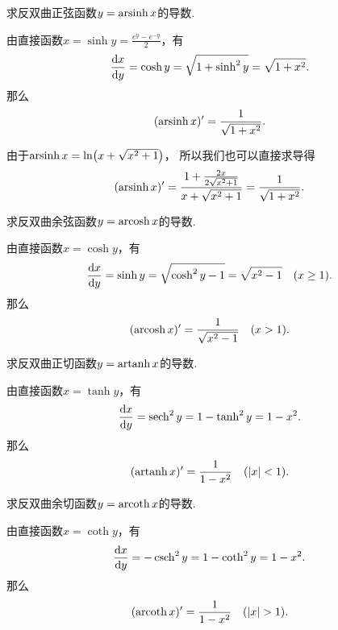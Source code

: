 \begin{example}\label{example:导数.反双曲正弦函数的导数}
求反双曲正弦函数\(y = \operatorname{arsinh} x\)的导数.
\begin{solution}
由直接函数\(x = \sinh y = \frac{e^y - e^{-y}}2\)，有\begin{equation*}
	\dv{x}{y}
	= \cosh y
	= \sqrt{1 + \sinh^2 y}
	= \sqrt{1 + x^2}.
\end{equation*}
那么\begin{equation*}
	(\operatorname{arsinh} x)' = \frac1{\sqrt{1+x^2}}.
\end{equation*}
\end{solution}
\end{example}
\begin{remark}
由于\(\operatorname{arsinh} x = \ln(x+\sqrt{x^2+1})\)，
所以我们也可以直接求导得\begin{equation*}
	(\operatorname{arsinh} x)' = \frac{1+\frac{2x}{2\sqrt{x^2+1}}}{x+\sqrt{x^2+1}}
	= \frac1{\sqrt{1+x^2}}.
\end{equation*}
\end{remark}

\begin{example}
求反双曲余弦函数\(y = \operatorname{arcosh} x\)的导数.
\begin{solution}
由直接函数\(x = \cosh y\)，有\begin{equation*}
	\dv{x}{y}
	= \sinh y
	= \sqrt{\cosh^2 y - 1}
	= \sqrt{x^2 - 1}
	\quad(x\geq1).
\end{equation*}
那么\begin{equation*}
	(\operatorname{arcosh} x)' = \frac1{\sqrt{x^2-1}}
	\quad(x>1).
\end{equation*}
\end{solution}
\end{example}

\begin{example}
求反双曲正切函数\(y = \operatorname{artanh} x\)的导数.
\begin{solution}
由直接函数\(x = \tanh y\)，有\begin{equation*}
	\dv{x}{y}
	= \sech^2 y
	= 1 - \tanh^2 y
	= 1 - x^2.
\end{equation*}
那么\begin{equation*}
	(\operatorname{artanh} x)' = \frac1{1-x^2}
	\quad(\abs{x}<1).
\end{equation*}
\end{solution}
\end{example}

\begin{example}
求反双曲余切函数\(y = \operatorname{arcoth} x\)的导数.
\begin{solution}
由直接函数\(x = \coth y\)，有\begin{equation*}
	\dv{x}{y} = -\csch^2 y
	= 1 - \coth^2 y
	= 1 - x^2.
\end{equation*}
那么\begin{equation*}
	(\operatorname{arcoth} x)' = \frac1{1-x^2}
	\quad(\abs{x}>1).
\end{equation*}
\end{solution}
\end{example}

